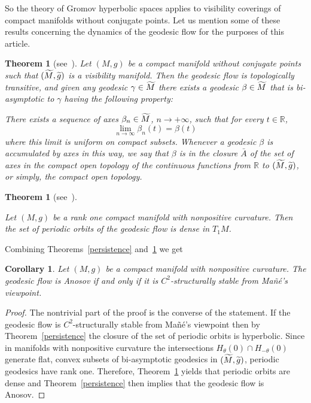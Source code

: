\documentclass[10pt]{amsart}
\newtheorem{theo}[cdrthm]{Theorem}
\newtheorem{coro}[cdrthm]{Corollary}
\theoremstyle{definition}
\newcommand{\bbR}{\mathbb{R}}
\let\oldtilde\tilde
\renewcommand*{\tilde}[1]{\mathchoice{\widetilde{#1}}{\widetilde{#1}}{\oldtilde{#1}}{\oldtilde{#1}}}
\begin{document}
So the theory of Gromov hyperbolic spaces applies to visibility coverings of compact manifolds without conjugate points. Let us mention some of these results concerning the dynamics of the geodesic flow for the purposes of this article.

\begin{theo}[{see~\cite{kn:Eberlein}}]\label{rank-one-density}
Let $(M,g)$ be a compact manifold without conjugate points such that $(\tilde{M}, \tilde{g})$ is a visibility manifold. Then the geodesic flow is topologically transitive, and given any geodesic $\gamma \in \tilde{M}$ there exists a geodesic $\beta \in \tilde{M}$ that is bi-asymptotic to $\gamma$ having the following property:

There exists a sequence of axes $\beta_{n} \in \tilde{M}$, $n \rightarrow +\infty$, such that for every $t \in \bbR$,
\[
\lim_{n\rightarrow \infty}\beta_{n}(t) = \beta(t)
\]
where this limit is uniform on compact subsets. Whenever a geodesic $\beta$ is accumulated by axes in this way, we say that $\beta$ is in the closure $\bar{A}$ of the set of axes in the compact open topology of the continuous functions from $\bbR$ to $(\tilde{M}, \tilde{g})$, or simply, the compact open topology.
\end{theo}

\begin{theo}[{see~\cite{kn:Eberlein-96}}]\label{rank-one-nonpositive}

Let $(M,g)$ be a rank one compact manifold with nonpositive curvature. Then the set of periodic orbits of the geodesic flow is dense in $T_{1}M$.
\end{theo}

Combining Theorems~\ref{persistence} and~\ref{rank-one-nonpositive} we get

\begin{coro}\label{rank-one-stability}
Let $(M,g)$ be a compact manifold with nonpositive curvature. The geodesic flow is Anosov if and only if it is $C^{2}$-structurally stable from Mañé's viewpoint.
\end{coro}

\begin{proof}
The nontrivial part of the proof is the converse of the statement. If the geodesic flow is $C^{2}$-structurally stable from Mañé's viewpoint then by Theorem~\ref{persistence} the closure of the set of periodic orbits is hyperbolic. Since in manifolds with nonpositive curvature the intersections $H_{\theta}(0) \cap H_{-\theta}(0)$ generate flat, convex subsets of bi-asymptotic geodesics in $(\tilde{M}, \tilde{g})$, periodic geodesics have rank one. Therefore, Theorem~\ref{rank-one-nonpositive} yields that periodic orbits are dense and Theorem~\ref{persistence} then implies that the geodesic flow is Anosov.
\end{proof}
\end{document}
